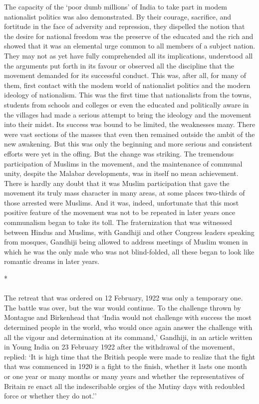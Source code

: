 \begin{multicols}{2}
The capacity of the `poor dumb millions' of India to take part in modem nationalist politics was also demonstrated. By their courage, sacrifice, and fortitude in the face of adversity and repression, they dispelled the notion that the desire for national freedom was the preserve of the educated and the rich and showed that it was an elemental urge common to all members of a subject nation. They may not as yet have fully comprehended all its implications, understood all the arguments put forth in its favour or observed all the discipline that the movement demanded for its successful conduct. This was, after all, for many of them, first contact with the modem world of nationalist politics and the modern ideology of nationalism. This was the first time that nationalists from the towns, students from schools and colleges or even the educated and politically aware in the villages had made a serious attempt to bring the ideology and the movement into their midst. Its success was bound to be limited, the weaknesses many. There were vast sections of the masses that even then remained outside the ambit of the new awakening. But this was only the beginning and more serious and consistent efforts were yet in the offing. But the change was striking. The tremendous participation of Muslims in the movement, and the maintenance of communal unity, despite the Malabar developments, was in itself no mean achievement. There is hardly any doubt that it was Muslim participation that gave the movement its truly mass character in many areas, at some places two-thirds of those arrested were Muslims. And it was, indeed, unfortunate that this most positive feature of the movement was not to be repeated in later years once communalism began to take its toll. The fraternization that was witnessed between Hindus and Muslims, with Gandhiji and other Congress leaders speaking from mosques, Gandhiji being allowed to address meetings of Muslim women in which he was the only male who was not blind-folded, all these began to look like romantic dreams in later years.

\begin{center}*\end{center}

\paragraph*{}

The retreat that was ordered on 12 February, 1922 was only a temporary one. The battle was over, but the war would continue. To the challenge thrown by Montague and Birkenhead that `India would not challenge with success the most determined people in the world, who would once again answer the challenge with all the vigour and determination at its command,' Gandhiji, in an article written in Young India on 23 February 1922 after the withdrawal of the movement, replied: `It is high time that the British people were made to realize that the fight that was commenced in 1920 is a fight to the finish, whether it lasts one month or one year or many months or many years and whether the representatives of Britain re enact all the indescribable orgies of the Mutiny days with redoubled force or whether they do not.''
\end{multicols}